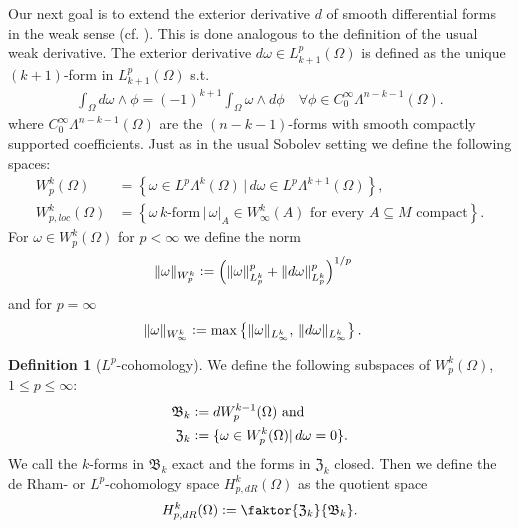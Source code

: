 \documentclass[12pt,a4paper]{article}
\theoremstyle{definition}
\newtheorem{definition}{Definition}
\newcommand{\lpcoho}{H^k_{p,dR}}
\newcommand{\norm}[1]{\lVert #1 \rVert}
\begin{document}
Our next goal is to extend the exterior derivative $d$ 
of smooth differential forms in the weak sense (cf. \cite{goldshtein}). 
This is done analogous to the definition of the usual weak derivative.
The exterior derivative $d\omega \in L^p_{k+1}(\Omega)$ is defined as
the unique $(k+1)$-form in $L^p_{k+1}(\Omega)$ s.t. 
\begin{align*}
\int_\Omega d\omega \wedge \phi = (-1)^{k+1}\int_\Omega \omega \wedge d\phi
\quad \forall \phi \in C_0^\infty \Lambda^{n-k-1}(\Omega).
\end{align*}
where $C_0^\infty \Lambda^{n-k-1}(\Omega)$ are the $(n-k-1)$-forms with 
smooth compactly supported coefficients.
Just as in the usual Sobolev setting we define the following spaces:
\begin{align*}
W^k_p(\Omega) &= \left\{ \omega \in L^p\Lambda^k(\Omega)\, | 
\, d\omega \in L^p\Lambda^{k+1}(\Omega) \right\}, \\ %
W^k_{p,loc}(\Omega) &= \left\{ \omega \, k \text{-form} \, | \,
\omega|_A \in W^k_\infty(A) \text{ for every } A \subseteq M \text{ compact} 
\right\}.
\end{align*}
For $\omega \in W^k_p(\Omega)$ for $p<\infty$ we define the norm 
\begin{align*}
\lVert \omega \rVert _{W^k_p} &\vcentcolon= 
\left( \norm{\omega}^p_{L^k_p} + \norm{d\omega}^p_{L^k_p} \right)^{1/p}
\end{align*}
and for $p=\infty$
\begin{align*}
    \lVert \omega \rVert _{W^k_\infty} &\vcentcolon= 
    \max\left\{ \norm{\omega}_{L^k_\infty},\, \norm{d\omega}_{L^k_\infty}
    \right\}.
\end{align*}
    
\begin{definition}[$L^p$-cohomology]
    We define the following subspaces of $W^k_p(\Omega)$, $1\leq p \leq\infty$:
    \begin{align*}
        \mathfrak{B}_k &\vcentcolon= dW^{k-1}_p(\Omega) \text{ and} \\
        \mathfrak{Z}_k &\vcentcolon= \{ \omega \in W^k_p(\Omega)| 
        \, d\omega = 0\}.
    \end{align*}
    We call the $k$-forms in $\mathfrak{B}_k$ exact and the forms in 
    $\mathfrak{Z}_k$ closed.
    Then we define the de Rham- or $L^p$-cohomology space $\lpcoho(\Omega)$ as 
    the quotient space
    \begin{align*}
        \lpcoho (\Omega) \vcentcolon= \faktor{\mathfrak{Z}_k}{\mathfrak{B}_k}.
    \end{align*}
\end{definition}
\vspace{0.5cm}
\end{document}
